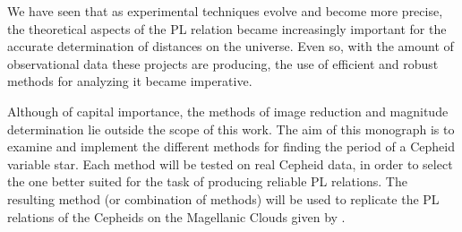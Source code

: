 We have seen that as experimental techniques evolve and become more precise, 
the theoretical aspects of the PL relation became increasingly important for the accurate determination of distances on the universe.
Even so, with the amount of observational data these projects are producing, 
the use of efficient and robust methods for analyzing it became imperative.

Although of capital importance, the methods of image reduction and magnitude determination lie outside the scope of this work.
The aim of this monograph is to examine and implement the different methods for finding the period of a Cepheid variable star.
Each method will be tested on real Cepheid data, in order to select the one better suited for the task of producing reliable PL relations.
The resulting method (or combination of methods) will be used to replicate the PL relations of the Cepheids on the Magellanic Clouds given by \cite{OGLE2016}.



